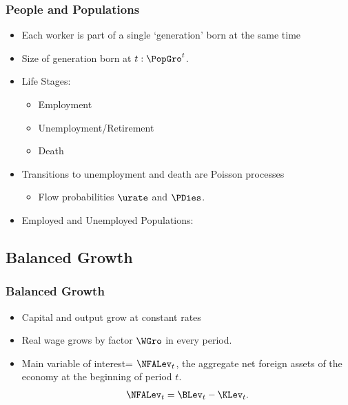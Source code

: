 \documentclass{beamer}
\renewcommand{\GDPLev}{\ensuremath{\pmb{Y}}}
\begin{document}
\begin{frame}
\frametitle{People and Populations}
    \begin{itemize}
    \item Each worker is part of a single `generation' born at the same time
    \item Size of generation born at $t: \PopGro^t$.
    \item Life Stages:
\begin{itemize}
\item Employment
\item Unemployment/Retirement
\item Death
\end{itemize}
    \item Transitions to unemployment and death are Poisson processes
\begin{itemize}
\item Flow probabilities $\urate$ and $\PDies$.
\end{itemize}
    \item Employed and Unemployed Populations:

\end{itemize}
\end{frame}


\subsection{Balanced Growth}
\begin{frame}
\frametitle{Balanced Growth}
    \begin{itemize}
    \item Capital and output grow at constant rates

    \item Real wage grows by factor $\WGro$ in every period.

    \item Main variable of interest= $\NFALev_t$, the aggregate net foreign assets of the economy at the beginning of period $t$.
\begin{eqnarray}
\NFALev_t = \BLev_t - \KLev_t.
\end{eqnarray}
    \end{itemize}
\end{frame}
\end{document}
